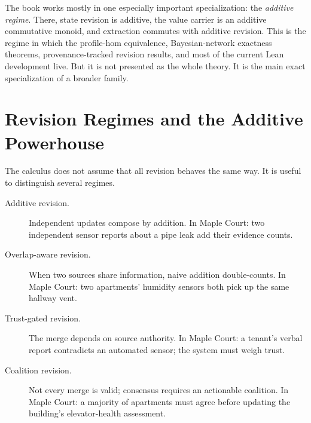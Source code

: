 The book works mostly in one especially important specialization: the
\emph{additive regime}.  There, state revision is additive, the value carrier is
an additive commutative monoid, and extraction commutes with additive
revision.  This is the regime in which the profile-hom equivalence,
Bayesian-network exactness theorems, provenance-tracked revision results, and
most of the current Lean development live.  But it is not presented as the
whole theory.  It is the main exact specialization of a broader family.


\section{Revision Regimes and the Additive Powerhouse}
\label{sec:overview-regimes}

The calculus does not assume that all revision behaves the same way.  It is
useful to distinguish several regimes.

\begin{description}
\item[Additive revision.]  Independent updates compose by addition.
  In Maple Court: two independent sensor reports about a pipe leak
  add their evidence counts.

\item[Overlap-aware revision.]  When two sources share information,
  naive addition double-counts.  In Maple Court: two apartments'
  humidity sensors both pick up the same hallway vent.

\item[Trust-gated revision.]  The merge depends on source authority.
  In Maple Court: a tenant's verbal report contradicts an automated
  sensor; the system must weigh trust.

\item[Coalition revision.]  Not every merge is valid; consensus
  requires an actionable coalition.  In Maple Court: a majority of
  apartments must agree before updating the building's elevator-health
  assessment.
\end{description}

